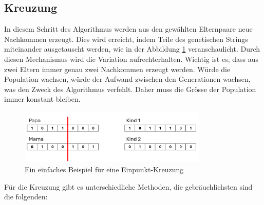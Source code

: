 %
%
%
%
\subsection{Kreuzung
\label{buch:paper:varalg:subsection:crossover}}
In diesem Schritt des Algorithmus werden aus den gewählten Elternpaare 
neue Nachkommen erzeugt. Dies wird erreicht, indem Teile des genetischen 
Strings miteinander ausgetauscht werden, 
wie in der Abbildung \ref{fig:one_point_crossover} veranschaulicht.
Durch diesen Mechanismus wird die Variation aufrechterhalten. Wichtig ist es,
dass aus zwei Eltern immer genau zwei Nachkommen erzeugt werden. Würde
die Population wachsen, würde der Aufwand zwischen den Generationen
wachsen, was den Zweck des Algorithmus verfehlt. Daher muss die Grösse der
Population immer konstant bleiben.
\begin{figure}
	\centering
	\includegraphics[width=0.8\textwidth]{
		papers/varalg/images/teil3/05GeneticStringCross.png
	}
	\caption{Ein einfaches Beispiel für eine Einpunkt-Kreuzung}
	\label{fig:one_point_crossover}
\end{figure}
Für die Kreuzung gibt es unterschiedliche Methoden, die gebräuchlichsten sind
die folgenden:
